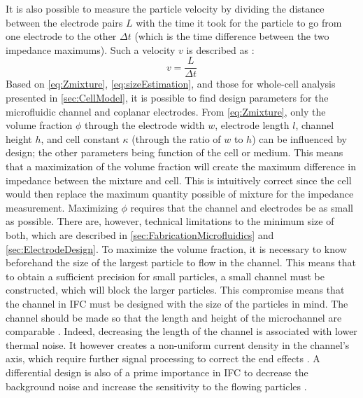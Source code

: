 It is also possible to measure the particle velocity by dividing the distance between the electrode pairs $L$ with the time it took for the particle to go from one electrode to the other $\Delta t$ (which is the time difference between the two impedance maximums). Such a velocity $v$ is described as :
\begin{equation}
\label{eq:VelocityEstimation}
v = \frac{L}{\Delta t}
\end{equation}
Based on \autoref{eq:Zmixture}, \autoref{eq:sizeEstimation}, and those for whole-cell analysis presented in \autoref{sec:CellModel}, it is possible to find design parameters for the microfluidic channel and coplanar electrodes. From \autoref{eq:Zmixture}, only the volume fraction $\phi$ through the electrode width $w$, electrode length $l$, channel height $h$, and cell constant $\kappa$ (through the ratio of $w$ to $h$) can be influenced by design; the other parameters being function of the cell or medium. This means that a maximization of the volume fraction will create the maximum difference in impedance between the mixture and cell. This is intuitively correct since the cell would then replace the maximum quantity possible of mixture for the impedance measurement. Maximizing $\phi$ requires that the channel and electrodes be as small as possible. There are, however, technical limitations to the minimum size of both, which are described in \autoref{sec:FabricationMicrofluidics} and \autoref{sec:ElectrodeDesign}. To maximize the volume fraction, it is necessary to know beforehand the size of the largest particle to flow in the channel. This means that to obtain a sufficient precision for small particles, a small channel must be constructed, which will block the larger particles. This compromise means that the channel in IFC must be designed with the size of the particles in mind. The channel should be made so that the length and height of the microchannel are comparable \cite{Gawad2004}. Indeed, decreasing the length of the channel is associated with lower thermal noise. It however creates a non-uniform current density in the channel’s axis, which require further signal processing to correct the end effects \cite{Gawad2004}. A differential design is also of a prime importance in IFC to decrease the background noise and increase the sensitivity to the flowing particles \cite{Xu2016,horowitz1989art}. \par 

